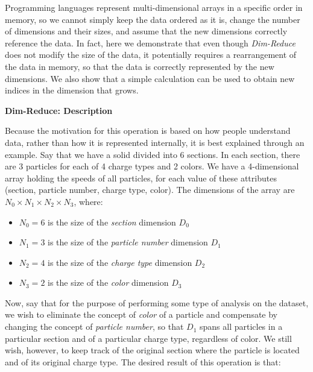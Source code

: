 \documentclass[conference]{IEEEtran}
\newcommand{\subsubsubsection}{\noindent\textbf}
\begin{document}
Programming languages represent multi-dimensional arrays in a specific order in
memory, so we cannot simply keep the data ordered as it is, change the number
of dimensions and their sizes, and assume that the new dimensions correctly
reference the data. In fact, here we demonstrate that even though {\em
Dim-Reduce} does not modify the size of the data, it potentially requires a
rearrangement of the data in memory, so that the data is correctly represented
by the new dimensions. We also show that a simple calculation can be used to
obtain new indices in the dimension that grows.

\subsubsubsection{Dim-Reduce: Description}

Because the motivation for this operation is based on how people understand
data, rather than how it is represented internally, it is best explained
through an example. Say that we have a solid divided into 6 sections. In each
section, there are 3 particles for each of 4 charge types and 2 colors. We have
a 4-dimensional array holding the speeds of all particles, for each value of
these attributes (section, particle number, charge type, color). The dimensions
of the array are $N_0{\times}N_1{\times}N_2{\times}N_3$, where:

\begin{itemize}

\item $N_0 = 6$ is the size of the {\em section} dimension $D_0$

\item $N_1 = 3$ is the size of the {\em particle number} dimension $D_1$

\item $N_2 = 4$ is the size of the {\em charge type} dimension $D_2$

\item $N_3 = 2$ is the size of the {\em color} dimension $D_3$

\end{itemize}

Now, say that for the purpose of performing some type of analysis on the
dataset, we wish to eliminate the concept of {\em color} of a particle and
compensate by changing the concept of {\em particle number}, so that $D_1$
spans all particles in a particular section and of a particular charge type,
regardless of color. We still wish, however, to keep track of the original
section where the particle is located and of its original charge type. The
desired result of this operation is that:
\end{document}
